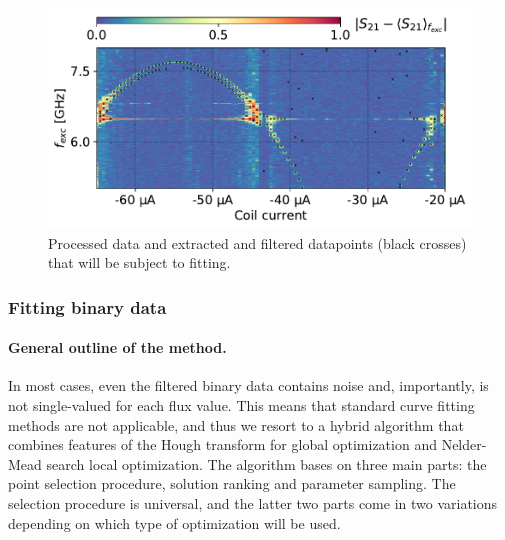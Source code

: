 \documentclass[%
 aip,
 amsmath,amssymb,
 reprint,%
]{revtex4-1}
\begin{document}
\begin{figure}
	\includegraphics[width=\linewidth]{extract_points}
	\caption{Processed data and extracted and filtered datapoints (black crosses) that will be subject to fitting.}
	\label{fig:extract_points}
\end{figure}

\subsubsection{Fitting binary data}

\paragraph{General outline of the method.} In most cases, even the filtered binary data contains noise and, importantly, is not single-valued for each flux value. This means that standard curve fitting methods are not applicable, and thus we resort to a hybrid algorithm that combines features of the Hough transform\cite{hough1962} for global optimization and Nelder-Mead search local optimization. The algorithm bases on three main parts: the point selection procedure, solution ranking and parameter sampling. The selection procedure is universal, and the latter two parts come in two variations depending on which type of optimization will be used.
\end{document}

